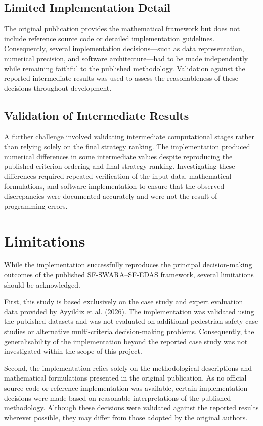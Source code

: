 \documentclass[11pt]{article}
\begin{document}
\subsection{Limited Implementation Detail}
The original publication provides the mathematical framework but does not include reference source code or detailed implementation guidelines. Consequently, several implementation decisions---such as data representation, numerical precision, and software architecture---had to be made independently while remaining faithful to the published methodology. Validation against the reported intermediate results was used to assess the reasonableness of these decisions throughout development.

\subsection{Validation of Intermediate Results}
A further challenge involved validating intermediate computational stages rather than relying solely on the final strategy ranking. The implementation produced numerical differences in some intermediate values despite reproducing the published criterion ordering and final strategy ranking. Investigating these differences required repeated verification of the input data, mathematical formulations, and software implementation to ensure that the observed discrepancies were documented accurately and were not the result of programming errors.

\section{Limitations}
While the implementation successfully reproduces the principal decision-making outcomes of the published SF-SWARA--SF-EDAS framework, several limitations should be acknowledged.

First, this study is based exclusively on the case study and expert evaluation data provided by Ayyildiz et al. (2026). The implementation was validated using the published datasets and was not evaluated on additional pedestrian safety case studies or alternative multi-criteria decision-making problems. Consequently, the generalisability of the implementation beyond the reported case study was not investigated within the scope of this project.

Second, the implementation relies solely on the methodological descriptions and mathematical formulations presented in the original publication. As no official source code or reference implementation was available, certain implementation decisions were made based on reasonable interpretations of the published methodology. Although these decisions were validated against the reported results wherever possible, they may differ from those adopted by the original authors.
\end{document}
